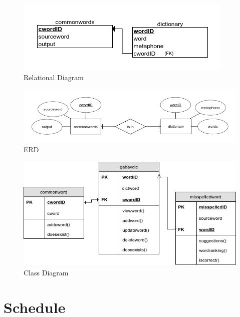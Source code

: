 \documentclass[12pt]{book}
\begin{document}
\begin{figure}
        \centering
          \includegraphics[scale=.65]{relational}
          \caption{Relational Diagram}
          \label{relational}
\end{figure}

\begin{figure}[H]
        \centering
          \includegraphics[scale=.50]{erd}
          \caption{ERD}
\end{figure}
\label{erd}
\begin{figure}
        \centering
          \includegraphics[scale=.75]{classdiagram}
          \caption{Class Diagram}
\end{figure}

\chapter{Schedule}
\end{document}
